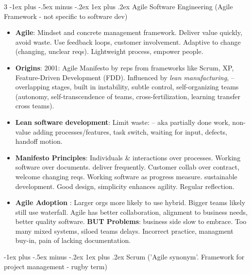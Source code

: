 \documentclass[a4paper, 10pt, landscape]{article}
\makeatletter
\renewcommand{\subsubsection}{\@startsection{subsubsection}{3}{0mm}%
                                {-1ex plus -.5ex minus -.2ex}%
                                {1ex plus .2ex}%
                                {\normalfont\small\bfseries}}
\makeatother
\begin{document}
\begin{multicols*}{3}
\subsubsection{Agile Software Engineering {\scriptsize (Agile Framework - not specific to software dev)}}
\begin{itemize}
\item \textbf{Agile}: Mindset and concrete management framework. Deliver value quickly, avoid waste. Use feedback loops, customer involvement. Adaptive to change (changing, unclear reqs). Lightweight process, empower people.
\item \textbf{Origins}: 2001: Agile Manifesto by reps from frameworks like Scrum, XP, Feature-Driven Development (FDD). Influenced by \textit{lean manufacturing}, -- overlapping stages, built in instability, subtle control, self-organizing teams (autonomy, self-transcendence of teams, cross-fertilization, learning transfer cross teams).
\item \textbf{Lean software development}: Limit waste: -- aka partially done work, non-value adding processes/features, task switch, waiting for input, defects, handoff motion.
\item \textbf{Manifesto Principles}:  Individuals \& interactions over processes. Working software over documents. deliver frequently. Customer collab over contract, welcome changing reqs. Working software as progress measure. sustainable development. Good design, simplicity enhances agility. Regular reflection.
\item \textbf{Agile Adoption }: Larger orgs more likely to use hybrid. Bigger teams likely still use waterfall. Agile has better collaboration, alignment to business needs, better quality software. \textbf{BUT Problems}: business side slow to embrace. Too many mixed systems, siloed teams delays. Incorrect practice, managment buy-in, pain of lacking documentation.
\end{itemize}

\subsubsection{Scrum {\scriptsize ('Agile synonym'. Framework for project management - rugby term)}}
 

\end{multicols*}
\end{document}
